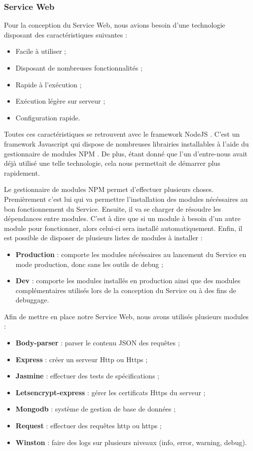 \subsubsection{Service Web}

Pour la conception du Service Web, nous avions besoin d'une technologie disposant des caractéristiques suivantes :
\begin{itemize}
    \item Facile à utiliser ;
    \item Disposant de nombreuses fonctionnalités ;
    \item Rapide à l'exécution ;
    \item Exécution légère sur serveur ;
    \item Configuration rapide.
\end{itemize}

Toutes ces caractéristiques se retrouvent avec le framework NodeJS \cite{nodejs}. C'est un framework Javascript qui dispose de nombreuses librairies installables à l'aide du gestionnaire de modules NPM \cite{npmjs}. De plus, étant donné que l'un d'entre-nous avait déjà utilisé une telle technologie, cela nous permettait de démarrer plus rapidement.

Le gestionnaire de modules NPM permet d'effectuer plusieurs choses.
Premièrement c'est lui qui va permettre l'installation des modules nécéssaires au bon fonctionnement du Service. Ensuite, il va se charger de résoudre les dépendances entre modules. C'est à dire que si un module à besoin d'un autre module pour fonctionner, alors celui-ci sera installé automatiquement.
Enfin, il est possible de disposer de plusieurs listes de modules à installer :
\begin{itemize}
    \item \textbf{Production} : comporte les modules nécéssaires au lancement du Service en mode production, donc sans les outils de debug ;
    \item \textbf{Dev} : comporte les modules installés en production ainsi que des modules complémentaires utilisés lors de la conception du Service ou à des fins de debuggage.
\end{itemize}

Afin de mettre en place notre Service Web, nous avons utilisés plusieurs modules :
\begin{itemize}
    \item \textbf{Body-parser} : parser le contenu JSON des requêtes ;
    \item \textbf{Express} : créer un serveur Http ou Https ;
    \item \textbf{Jasmine} : effectuer des tests de spécifications ;
    \item \textbf{Letsencrypt-express} : gérer les certificats Https du serveur ;
    \item \textbf{Mongodb} : système de gestion de base de données ;
    \item \textbf{Request} : effectuer des requêtes http ou https ;
    \item \textbf{Winston} : faire des logs sur plusieurs niveaux (info, error, warning, debug).
\end{itemize}

